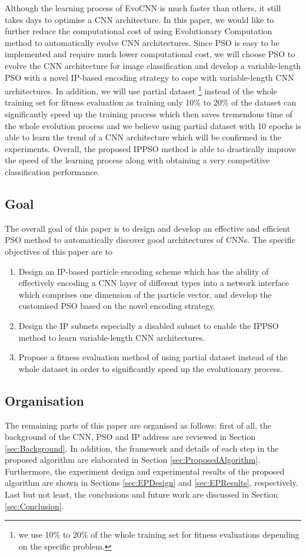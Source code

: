 \documentclass[conference]{IEEEtran}
\begin{document}
Although the learning process of EvoCNN is much faster than others, it still takes days to optimise a CNN architecture. In this paper, we would like to further reduce the computational cost of using Evolutionary Computation method to automatically evolve CNN architectures. Since PSO is easy to be implemented and require much lower computational cost, we will choose PSO to evolve the CNN architecture for image classification and develop a variable-length PSO with a novel IP-based encoding strategy to cope with variable-length CNN architectures. In addition, we will use partial dataset \footnote{we use 10\% to 20\% of the whole training set for fitness evaluations depending on the specific problem.} instead of the whole training set for fitness evaluation as training only 10\% to 20\% of the dataset can significantly speed up the training process which then saves tremendous time of the whole evolution process and we believe using partial dataset with 10 epochs is able to learn the trend of a CNN architecture which will be confirmed in the experiments. Overall, the proposed IPPSO method is able to drastically improve the speed of the learning process along with obtaining a very competitive classification performance. 


\subsection{Goal}
The overall goal of this paper is to design and develop an effective and efficient PSO method to automatically discover good architectures of CNNs. The specific objectives of this paper are to

\begin{enumerate}
	\item Design an IP-based particle encoding scheme which has the ability of effectively encoding a CNN layer of different types into a network interface which comprises one dimension of the particle vector, and develop the customised PSO based on the novel encoding strategy. 
	\item Design the IP subnets especially a disabled subnet to enable the IPPSO method to learn variable-length CNN architectures. 
	\item Propose a fitness evaluation method of using partial dataset instead of the whole dataset in order to significantly speed up the evolutionary process. 
\end{enumerate} 

\subsection{Organisation}
The remaining parts of this paper are organised as follows: first of all, the background of the CNN, PSO and IP address are
reviewed in Section \ref{sec:Background}. In addition, the framework and details of each step in the proposed algorithm are elaborated in Section \ref{sec:ProposedAlgorithm}. Furthermore, the experiment design and experimental results of the proposed algorithm are shown in Sections \ref{sec:EPDesign} and \ref{sec:EPResults}, respectively. Last but not least, the conclusions and future work are discussed in Section \ref{sec:Conclusion}. 
\end{document}
